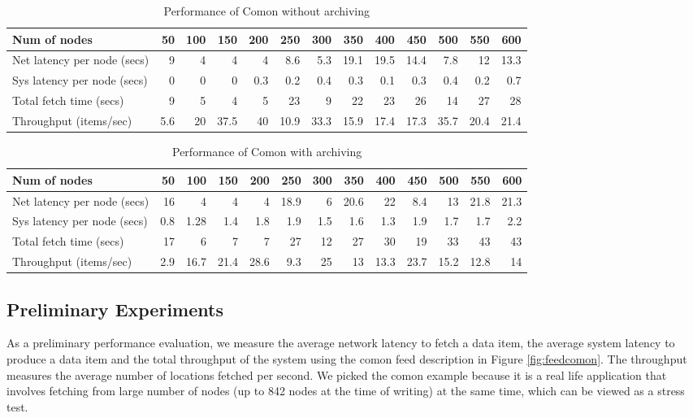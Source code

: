 \begin{table*}[th]
\begin{center}
\begin{tabular}{|l|r|r|r|r|r|r|r|r|r|r|r|r|}\hline
Num of nodes&	50&	100&	150&	200&	250&	300&	350&	400&	450&	500&	550&	600 \\ \hline\hline
Net latency per node (secs)&	9&	4&	4&	4&	8.6&	5.3&	19.1&	19.5&	14.4&	7.8&	12&	13.3 \\ \hline
Sys latency per node (secs)&	0&	0&	0&	0.3&	0.2&	0.4&	0.3&	0.1&	0.3&	0.4&	0.2&	0.7 \\ \hline
Total fetch time (secs)&	9&	5&	4&	5&	23&	9&	22&	23&	26&	14&	27&	28 \\ \hline	
Throughput (items/sec)&	5.6&	20&	37.5&	40&	10.9&	33.3&	15.9&	17.4&	17.3&	35.7&	20.4&	21.4 \\ \hline
\end{tabular}
\end{center}
\caption{Performance of Comon without archiving}
\label{tab:comon-noarch}
\end{table*}


\begin{table*}
\begin{center}
\begin{tabular}{|l|r|r|r|r|r|r|r|r|r|r|r|r|}\hline
Num of nodes&	50&	100&	150&	200&	250&	300&	350&	400&	450&	500&	550&	600 \\ \hline\hline
Net latency per node (secs)&	16&	4&	4&	4&	18.9&	6&	20.6&	22&	8.4&	13&	21.8&	21.3 \\ \hline
Sys latency per node (secs)&	0.8&	1.28&	1.4&	1.8&	1.9&	1.5&	1.6&	1.3&	1.9&	1.7&	1.7&	2.2 \\ \hline
Total fetch time (secs)&	17&	6&	7&	7&	27&	12&	27&	30&	19&	33&	43&	43 \\ \hline
Throughput (items/sec)&	2.9&	16.7&	21.4&	28.6&	9.3&	25&	13&	13.3&	23.7&	15.2&	12.8&	14 \\ \hline
\end{tabular}
\end{center}
\caption{Performance of Comon with archiving}
\label{tab:comon-arch}
\end{table*}

\subsection{Preliminary Experiments} \label{sec:experiments}
As a preliminary performance evaluation, 
we measure the average network latency
to fetch a data item, the average system latency 
to produce a data item
and the total throughput of the system using the comon feed
description in Figure \ref{fig:feedcomon}. 
The throughput measures the average
number of locations fetched per second. We picked
the comon example because it is a real life
application that involves fetching from large number of 
nodes (up to 842 nodes at the time of writing)
at the same time, which can be viewed as a stress test. 

